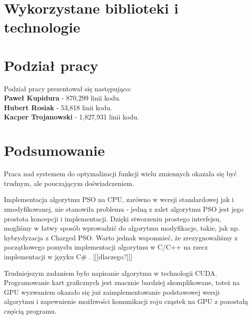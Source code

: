 \documentclass[12pt, twoside, openany, abstract=on]{report}
\theoremstyle{definition}
\begin{document}

\chapter{Wykorzystane biblioteki i technologie}


\chapter{Podział pracy}
Podział pracy prezentował się następująco:\\

\textbf{Paweł Kupidura} - 870,299 linii kodu.\\

\textbf{Hubert Rosiak} - 53,818 linii kodu.\\

\textbf{Kacper Trojanowski} - 1,827,931 linii kodu.\\


\chapter{Podsumowanie}




Praca nad systemem do optymalizacji funkcji wielu zmiennych okazała się być trudnym, ale pouczającym doświadczeniem. 

Implementacja algorytmu PSO na CPU, zarówno w wersji standardowej jak i zmodyfikowanej, nie stanowiła problemu - jedną z zalet algorytmu PSO jest jego prostota koncepcji i implementacji. Dzięki stworzeniu prostego interfejsu, mogliśmy w łatwy sposób wprowadzić do algorytmu modyfikacje, takie, jak np. hybrydyzacja z Charged PSO. Warto jednak wspomnieć, że zrezygnowaliśmy z początkowego pomysłu implementacji algorytmu w C/C++ na rzecz implementacji w języku C\# . [[[dlaczego?]]]

Trudniejszym zadaniem było napisanie algorytmu w technologii CUDA. Programowanie kart graficznych jest znacznie bardziej skomplikowane, toteż na GPU wyzwaniem okazało się już zaimplementowanie podstawowej wersji algorytmu i zapewnienie możliwości komunikacji roju cząstek na GPU z pozostałą częścią programu.
\end{document}
